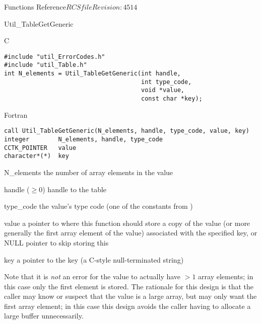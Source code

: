 \begin{cactuspart}{ Functions Reference}{$RCSfile$}{$Revision: 4514 $}
\begin{FunctionDescription}{Util\_TableGetGeneric}
\begin{SynopsisSection}
\begin{Synopsis}{C}
\begin{verbatim}
#include "util_ErrorCodes.h"
#include "util_Table.h"
int N_elements = Util_TableGetGeneric(int handle,
                                      int type_code,
                                      void *value,
                                      const char *key);
\end{verbatim}
\end{Synopsis}
\begin{Synopsis}{Fortran}
\begin{verbatim}
call Util_TableGetGeneric(N_elements, handle, type_code, value, key)
integer        N_elements, handle, type_code
CCTK_POINTER   value
character*(*)  key
\end{verbatim}
\end{Synopsis}
\end{SynopsisSection}

\begin{ResultSection}
\begin{Result}{N\_elements}
the number of array elements in the value
\end{Result}
\end{ResultSection}

\begin{ParameterSection}
\begin{Parameter}{handle ($\ge 0$)}
handle to the table
\end{Parameter}
\begin{Parameter}{type\_code}
the value's type code
(one of the  constants from )
\end{Parameter}
\begin{Parameter}{value}
a pointer to where this function should store a copy of the value
(or more generally the first array element of the value) associated
with the specified key,
or NULL pointer to skip storing this
\end{Parameter}
\begin{Parameter}{key}
a pointer to the key (a C-style null-terminated string)
\end{Parameter}
\end{ParameterSection}

\begin{Discussion}
Note that it is {\em not\/} an error for the value to actually have
$> 1$ array elements; in this case only the first element is stored.
The rationale for this design is that the caller may know or suspect
that the value is a large array, but may only want the first array
element; in this case this design avoids the caller having to allocate
a large buffer unnecessarily.


\end{Discussion}
\end{FunctionDescription}
\end{cactuspart}
